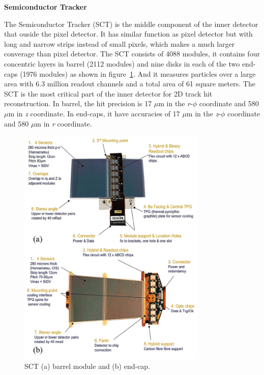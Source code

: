 \textbf{Semiconductor Tracker}

The Semiconductor Tracker (SCT) is the middle component of the inner detector that ouside the pixel detector.
It has similar function as pixel detector but with long and narrow strips instead of small pixels, which makes a much larger converage than pixel detector.
The SCT consists of 4088 modules, it contains four concentric layers in barrel (2112 modules) and nine disks in each of the two end-caps (1976 modules) as shown in figure~\ref{fig:inner_sct}.
And it measures particles over a large area with 6.3 million readout channels and a total area of 61 square meters.
The SCT is the most critical part of the inner detector for 2D track hit reconstruction.
In barrel, the hit precision is 17 $\mu$m in the \textit{r}-$\phi$ coordinate and 580 $\mu$m in \textit{z} coordinate.
In end-caps, it have accuracies of 17 $\mu$m in the \textit{z}-$\phi$ coordinate and 580 $\mu$m in \textit{r} coordinate.
\begin{figure}[!htb]
  \centering
  \includegraphics[width=0.8\textwidth]{figures/Detector/inner_SCT.png}
  \caption{SCT (a) barrel module and (b) end-cap\cite{Sultan:phdthesis}.}
  \label{fig:inner_sct}
\end{figure}

